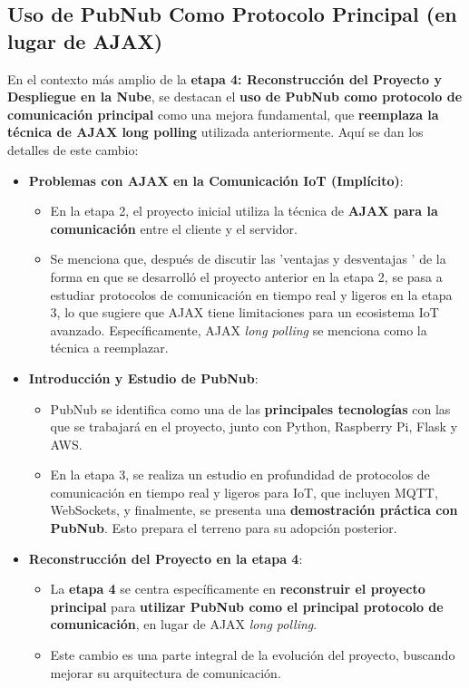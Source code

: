 \documentclass{report}
\begin{document}
\subsection{Uso de PubNub Como Protocolo Principal (en lugar de AJAX)}
En el contexto más amplio de la \textbf{etapa 4: Reconstrucción del Proyecto y Despliegue en la Nube}, se  destacan el \textbf{uso de PubNub como 
protocolo de comunicación principal} como una mejora fundamental, que \textbf{reemplaza la técnica de AJAX long polling} utilizada anteriormente. 
Aquí se dan los detalles de este cambio:

\begin{itemize}
    \item \textbf{Problemas con AJAX en la Comunicación IoT (Implícito)}:
    \begin{itemize}
        \item En la etapa 2, el proyecto inicial utiliza la técnica de \textbf{AJAX para la comunicación} entre el cliente y el servidor.
        \item Se menciona que, después de discutir las  'ventajas y desventajas ' de la forma en que se desarrolló el proyecto anterior en 
        la etapa 2, se pasa a estudiar protocolos de comunicación en tiempo real y ligeros en la etapa 3, lo que sugiere que AJAX tiene limitaciones 
        para un ecosistema IoT avanzado. Específicamente, AJAX \textit{long polling} se menciona como la técnica a reemplazar.
    \end{itemize}

    \item \textbf{Introducción y Estudio de PubNub}:
    \begin{itemize}
        \item PubNub se identifica como una de las \textbf{principales tecnologías} con las que se trabajará en el proyecto, junto con Python, Raspberry 
        Pi, Flask y AWS.
        \item En la etapa 3, se realiza un estudio en profundidad de protocolos de comunicación en tiempo real y ligeros para IoT, que incluyen MQTT, 
        WebSockets, y finalmente, se presenta una \textbf{demostración práctica con PubNub}. Esto prepara el terreno para su adopción posterior.
    \end{itemize}

    \item \textbf{Reconstrucción del Proyecto en la etapa 4}:
    \begin{itemize}
        \item La \textbf{etapa 4} se centra específicamente en \textbf{reconstruir el proyecto principal} para \textbf{utilizar PubNub como el principal 
        protocolo de comunicación}, en lugar de AJAX \textit{long polling}.
        \item Este cambio es una parte integral de la evolución del proyecto, buscando mejorar su arquitectura de comunicación.
    \end{itemize}


\end{itemize}
\end{document}

